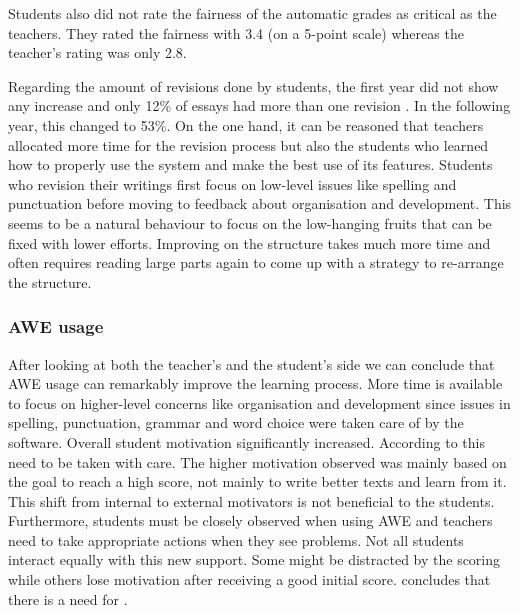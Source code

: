 \documentclass[runningheads]{llncs}
\begin{document}
Students also did not rate the fairness of the automatic grades as critical as the teachers. They rated the fairness with 3.4 (on a 5-point scale) whereas the teacher's rating was only 2.8.

Regarding the amount of revisions done by students, the first year did not show any increase and only 12\% of essays had more than one revision \citep{grimes_utility_2010}. In the following year, this changed to 53\%. On the one hand, it can be reasoned that teachers allocated more time for the revision process but also the students who learned how to properly use the system and make the best use of its features.   Students who revision their writings first focus on low-level issues like spelling and punctuation before moving to feedback about organisation and development. This seems to be a natural behaviour to focus on the low-hanging fruits that can be fixed with lower efforts. Improving on the structure takes much more time and often requires reading large parts again to come up with a strategy to re-arrange the structure.

\subsubsection{AWE usage} After looking at both the teacher's and the student's side we can conclude that AWE usage can remarkably improve the learning process. More time is available to focus on higher-level concerns like organisation and development since issues in spelling, punctuation, grammar and word choice were taken care of by the software. Overall student motivation significantly increased. According to \textcite{grimes_utility_2010} this need to be taken with care. The higher motivation observed was mainly based on the goal to reach a high score, not mainly to write better texts and learn from it. This shift from internal to external motivators is not beneficial to the students. Furthermore, students must be closely observed when using AWE and teachers need to take appropriate actions when they see problems. Not all students interact equally with this new support. Some might be distracted by the scoring while others lose motivation after receiving a good initial score. \citeauthor{grimes_utility_2010} concludes that there is a need for .
\end{document}
